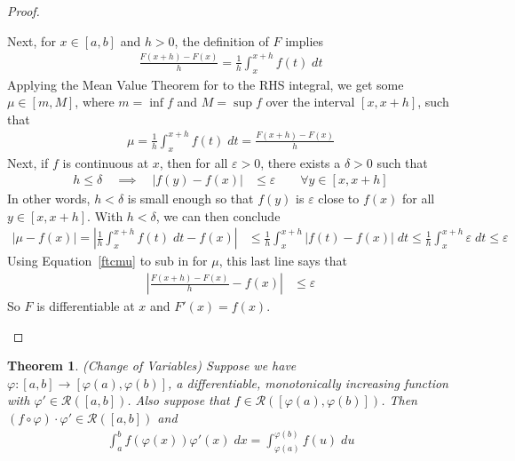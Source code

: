 \documentclass[12pt]{book}
\numberwithin{equation}{section} %
\theoremstyle{plain}
\newtheorem{thm}{Theorem}[section]
\theoremstyle{definition}
\theoremstyle{remark}
\begin{document}
\begin{proof}
\begin{enumerate}[label=\Roman*.]
    Next, for $x\in[a,b]$ and $h>0$, the definition of $F$ implies
    \begin{align*}
      \frac{F(x+h)-F(x)}{h} = \frac{1}{h}\int^{x+h}_x f(t)\;dt
    \end{align*}
    Applying the Mean Value Theorem for to the RHS integral, we
    get some $\mu \in [m, M]$, where $m = \inf f$ and $M = \sup f$ over
    the interval $[x,x+h]$, such that
    \begin{align}
      \mu = \frac{1}{h}\int^{x+h}_x f(t)\;dt
      = \frac{F(x+h)-F(x)}{h}
      \label{ftcmu}
    \end{align}
    Next, if $f$ is continuous at $x$, then for all $\varepsilon>0$,
    there exists a $\delta>0$ such that
    \begin{align}
        h \leq \delta \quad \implies \quad |f(y) - f(x)|
        &\leq\varepsilon
        \qquad \forall y\in[x,x+h]
    \end{align}
    In other words, $h<\delta$ is small enough so that $f(y)$ is
    $\varepsilon$ close to $f(x)$ for all $y\in[x,x+h]$.
    With $h<\delta$, we can then conclude
    \begin{align*}
      \left\lvert
      \mu - f(x)
      \right\rvert
      =
      \left\lvert
      \frac{1}{h}\int^{x+h}_x f(t)\;dt
      - f(x)
      \right\rvert
      &\leq
      \frac{1}{h}\int^{x+h}_x\big|f(t)-f(x)\big|\;dt
      \leq
      \frac{1}{h}\int^{x+h}_x\varepsilon\;dt
      \leq\varepsilon
    \end{align*}
    Using Equation~\ref{ftcmu} to sub in for $\mu$, this last line says
    that
    \begin{align*}
      \left\lvert \frac{F(x+h)-F(x)}{h}- f(x)
      \right\rvert
      &\leq\varepsilon
    \end{align*}
    So $F$ is differentiable at $x$ and $F'(x)=f(x)$.
\end{enumerate}
\end{proof}

\clearpage
\begin{thm}\emph{(Change of Variables)}
Suppose we have $\varphi: [a,b] \rightarrow [\varphi(a), \varphi(b)]$, a
differentiable, monotonically increasing function with
$\varphi'\in\mathscr{R}([a,b])$. Also suppose that
$f\in\mathscr{R}([\varphi(a),\varphi(b)])$. Then $(f\circ
\varphi)\cdot\varphi' \in \mathscr{R}([a,b])$ and
\begin{align*}
  \int^b_a f\left(\varphi(x)\right) \varphi'(x)\;dx
  = \int^{\varphi(b)}_{\varphi(a)} f(u)\;du
\end{align*}
\end{thm}
\end{document}
